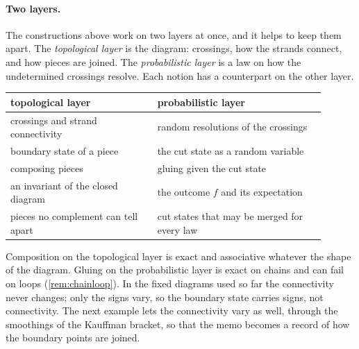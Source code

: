 \documentclass[11pt]{article}
\theoremstyle{definition}\newtheorem{definition}[theorem]{Definition}\newtheorem{remark}[theorem]{Remark}\newtheorem{example}[theorem]{Example}\newtheorem{problem}[theorem]{Open problem}\crefname{problem}{Problem}{Problems}
\begin{document}
\paragraph{Two layers.} The constructions above work on two layers at once, and it helps to keep them apart. The \emph{topological layer} is the diagram: crossings, how the strands connect, and how pieces are joined. The \emph{probabilistic layer} is a law on how the undetermined crossings resolve. Each notion has a counterpart on the other layer.
\begin{center}
\small
\begin{tabular}{p{0.42\linewidth}p{0.48\linewidth}}
\toprule
topological layer & probabilistic layer\\\midrule
crossings and strand connectivity & random resolutions of the crossings\\
boundary state of a piece & the cut state as a random variable\\
composing pieces & gluing given the cut state\\
an invariant of the closed diagram & the outcome $f$ and its expectation\\
pieces no complement can tell apart & cut states that may be merged for every law\\
\bottomrule
\end{tabular}
\end{center}
Composition on the topological layer is exact and associative whatever the shape of the diagram. Gluing on the probabilistic layer is exact on chains and can fail on loops (\cref{rem:chainloop}). In the fixed diagrams used so far the connectivity never changes; only the signs vary, so the boundary state carries signs, not connectivity. The next example lets the connectivity vary as well, through the smoothings of the Kauffman bracket, so that the memo becomes a record of how the boundary points are joined.
\end{document}
